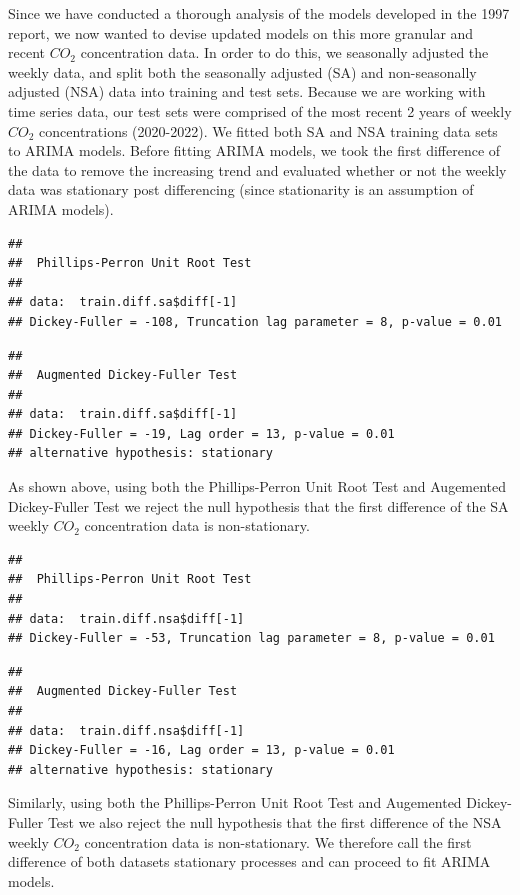 \documentclass[AER]{AEA}
\begin{document}
Since we have conducted a thorough analysis of the models developed in
the 1997 report, we now wanted to devise updated models on this more
granular and recent \(CO_{2}\) concentration data. In order to do this,
we seasonally adjusted the weekly data, and split both the seasonally
adjusted (SA) and non-seasonally adjusted (NSA) data into training and
test sets. Because we are working with time series data, our test sets
were comprised of the most recent 2 years of weekly \(CO_{2}\)
concentrations (2020-2022). We fitted both SA and NSA training data sets
to ARIMA models. Before fitting ARIMA models, we took the first
difference of the data to remove the increasing trend and evaluated
whether or not the weekly data was stationary post differencing (since
stationarity is an assumption of ARIMA models).

\begin{verbatim}
## 
##  Phillips-Perron Unit Root Test
## 
## data:  train.diff.sa$diff[-1]
## Dickey-Fuller = -108, Truncation lag parameter = 8, p-value = 0.01
\end{verbatim}

\begin{verbatim}
## 
##  Augmented Dickey-Fuller Test
## 
## data:  train.diff.sa$diff[-1]
## Dickey-Fuller = -19, Lag order = 13, p-value = 0.01
## alternative hypothesis: stationary
\end{verbatim}

As shown above, using both the Phillips-Perron Unit Root Test and
Augemented Dickey-Fuller Test we reject the null hypothesis that the
first difference of the SA weekly \(CO_{2}\) concentration data is
non-stationary.

\begin{verbatim}
## 
##  Phillips-Perron Unit Root Test
## 
## data:  train.diff.nsa$diff[-1]
## Dickey-Fuller = -53, Truncation lag parameter = 8, p-value = 0.01
\end{verbatim}

\begin{verbatim}
## 
##  Augmented Dickey-Fuller Test
## 
## data:  train.diff.nsa$diff[-1]
## Dickey-Fuller = -16, Lag order = 13, p-value = 0.01
## alternative hypothesis: stationary
\end{verbatim}

Similarly, using both the Phillips-Perron Unit Root Test and Augemented
Dickey-Fuller Test we also reject the null hypothesis that the first
difference of the NSA weekly \(CO_{2}\) concentration data is
non-stationary. We therefore call the first difference of both datasets
stationary processes and can proceed to fit ARIMA models.
\end{document}
